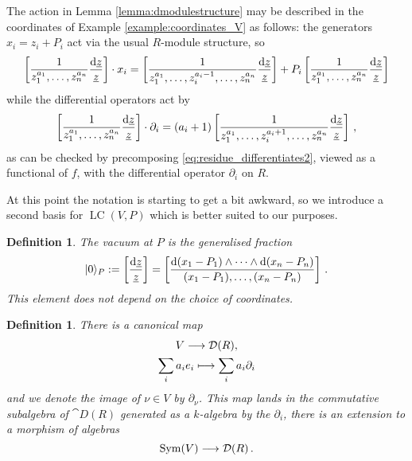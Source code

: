 \documentclass[english,letter paper,12pt,reqno]{article}
\DeclarePairedDelimiter\ket{\lvert}{\rangle}
\theoremstyle{example}
\newtheorem{definition}[theorem]{Definition}
\numberwithin{equation}{section}
\DeclareMathOperator{\Sym}{Sym}
\DeclareMathOperator{\LC}{LC}
\begin{document}
The action in Lemma \ref{lemma:dmodulestructure} may be described in the coordinates of Example \ref{example:coordinates_V} as follows: the generators $x_i = z_i + P_i$ act via the usual $R$-module structure, so
\begin{equation}
\left[ \frac{1}{z_1^{a_1}, \ldots, z_n^{a_n}} \frac{\operatorname{d}\!{\underline{z}}}{\underline{z}} \right] \cdot x_i = \left[ \frac{1}{z_1^{a_1}, \ldots, z_i^{a_i-1}, \ldots, z_n^{a_n}} \frac{\operatorname{d}\!{\underline{z}}}{\underline{z}} \right] + P_i \left[ \frac{1}{z_1^{a_1}, \ldots, z_n^{a_n}} \frac{\operatorname{d}\!{\underline{z}}}{\underline{z}} \right]
\end{equation}
while the differential operators act by
\begin{equation}\label{eq:action_diff_op}
\left[ \frac{1}{z_1^{a_1}, \ldots, z_n^{a_n}} \frac{\operatorname{d}\!{\underline{z}}}{\underline{z}} \right] \cdot \partial_i = (a_i + 1) \left[ \frac{1}{z_1^{a_1}, \ldots, z_i^{a_i+1}, \ldots, z_n^{a_n}} \frac{\operatorname{d}\!{\underline{z}}}{\underline{z}} \right]\,,
\end{equation}
as can be checked by precomposing \eqref{eq:residue_differentiates2}, viewed as a functional of $f$, with the differential operator $\partial_i$ on $R$. 

At this point the notation is starting to get a bit awkward, so we introduce a second basis for $\LC(V,P)$ which is better suited to our purposes.

\begin{definition} The \emph{vacuum} at $P$ is the generalised fraction
\[
\ket{0}_P := \left[ \frac{\ud{\underline{z}}}{\underline{z}} \right] = \left[ \frac{\ud{(x_1-P_1)} \wedge \cdots \wedge \ud{(x_n - P_n)}}{(x_1-P_1), \ldots, (x_n-P_n)} \right]\,.
\]
This element does not depend on the choice of coordinates.
\end{definition}

\begin{definition}\label{def:symvtoder} There is a canonical map
\begin{gather*}
V \longrightarrow \mathcal{D}(R),\\
\sum_i a_i e_i \longmapsto \sum_i a_i \partial_i
\end{gather*}
and we denote the image of $\nu \in V$ by $\partial_{\nu}$. This map lands in the commutative subalgebra of $\cat{D}(R)$ generated as a $k$-algebra by the $\partial_i$, there is an extension to a morphism of algebras
\begin{equation}\label{eq:symvtoder}
\Sym(V) \lto \cat{D}(R)\,.
\end{equation}
\end{definition}
\end{document}
